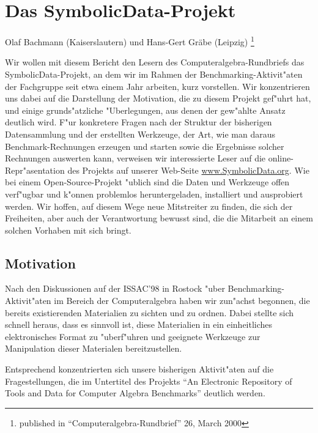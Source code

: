 \documentclass{article}
\newcommand{\SD}{{\sc Symbolic\-Data}}
\begin{document}
\section*{\centering Das \SD-Projekt} 

\begin{center}
Olaf Bachmann (Kaiserslautern) und Hans-Gert Gr\"abe (Leipzig)
\footnote{published in ``Computeralgebra-Rundbrief'' 26, March 2000}
\end{center}

Wir wollen mit diesem Bericht den Lesern des
Computeralgebra-Rundbriefs das \SD-Projekt, an dem wir im Rahmen der
Benchmarking-Aktivit"aten der Fachgruppe seit etwa einem Jahr
arbeiten, kurz vorstellen.  Wir konzentrieren uns dabei auf die
Darstellung der Motivation, die zu diesem Projekt gef"uhrt hat, und
einige grunds"atzliche "Uberlegungen, aus denen der gew"ahlte Ansatz
deutlich wird.  F"ur konkretere Fragen nach der Struktur der
bisherigen Datensammlung und der erstellten Werkzeuge, der Art, wie
man daraus Benchmark-Rechnungen erzeugen und starten sowie die
Ergebnisse solcher Rechnungen auswerten kann, verweisen wir
interessierte Leser auf die online-Repr"asentation des Projekts auf
unserer Web-Seite \url{www.SymbolicData.org}.  Wie bei einem
Open-Source-Projekt "ublich sind die Daten und Werkzeuge offen
verf"ugbar und k"onnen problemlos heruntergeladen, installiert und
ausprobiert werden.  Wir hoffen, auf diesem Wege neue Mitstreiter zu
finden, die sich der Freiheiten, aber auch der Verantwortung bewusst
sind, die die Mitarbeit an einem solchen Vorhaben mit sich bringt. 

\subsection*{Motivation}

Nach den Diskussionen auf der ISSAC'98 in Rostock "uber
Benchmarking-Aktivit"aten im Bereich der Computeralgebra haben wir
zun"achst begonnen, die bereits existierenden Materialien zu sichten
und zu ordnen. Dabei stellte sich schnell heraus, dass es sinnvoll
ist, diese Materialien in ein einheitliches elektronisches Format zu
"uberf"uhren und geeignete Werkzeuge zur Manipulation dieser
Materialen bereitzustellen.

Entsprechend konzentrierten sich unsere bisherigen Aktivit"aten auf
die Fragestellungen, die im Untertitel des Projekts ``An Electronic
Repository of Tools and Data for Computer Algebra Benchmarks''
deutlich werden.
\end{document}
